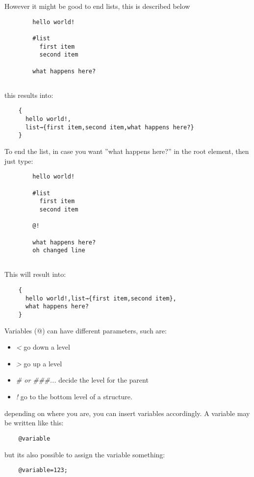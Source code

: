 \documentclass{book}
\begin{document}
	However it might be good to end lists, this is described below
	
	\begin{verbatim}
		hello world!
		
		#list
		  first item
		  second item
			
		what happens here?
		
	\end{verbatim}
	
	this results into:
	
	\begin{verbatim}
	{
	  hello world!,
	  list→{first item,second item,what happens here?}
	}
	\end{verbatim}
	
	To end the list, in case you want ''what happens here?'' in the root element, then just type:
	
	\begin{verbatim}
		hello world!
		
		#list
		  first item
		  second item
		
		@!
		
		what happens here?
		oh changed line
		
	\end{verbatim}
	
	This will result into:
	
	\begin{verbatim}
	{
	  hello world!,list→{first item,second item},
	  what happens here?
	}
	\end{verbatim}
	
	Variables (@) can have different parameters, such are:
	\begin{itemize}
		\item \emph{<} go down a level
		\item \emph{>} go up a level
		\item \emph{\# or \#\#\#...} decide the level for the parent
		\item \emph{!} go to the bottom level of a {} structure.
	\end{itemize}
	depending on where you are, you can insert variables accordingly. A variable may be written like this:
	
	\begin{verbatim}
	@variable
	\end{verbatim}
	
	but its also possible to assign the variable something:
	
	\begin{verbatim}
	@variable=123;
	\end{verbatim}
	
\end{document}
